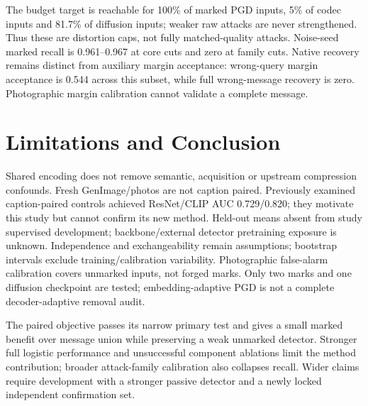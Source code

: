 \documentclass[conference]{IEEEtran}
\begin{document}
The budget target is reachable for 100\% of marked PGD inputs, 5\% of codec
inputs and 81.7\% of diffusion inputs; weaker raw attacks are never strengthened.
Thus these are distortion caps, not fully matched-quality attacks.
Noise-seed marked recall is 0.961--0.967 at core cuts and zero at family cuts.
Native recovery remains distinct from auxiliary margin acceptance: wrong-query
margin acceptance is 0.544 across this subset, while full wrong-message recovery
is zero. Photographic margin calibration cannot validate a complete message.

\section{Limitations and Conclusion}
Shared encoding does not remove semantic, acquisition or upstream compression
confounds. Fresh GenImage/photos are not caption paired. Previously examined
caption-paired controls achieved ResNet/CLIP AUC 0.729/0.820; they motivate
this study but cannot confirm its new method.
Held-out means absent from study supervised development; backbone/external
detector pretraining exposure is unknown. Independence and exchangeability
remain assumptions; bootstrap intervals exclude training/calibration variability.
Photographic false-alarm calibration covers unmarked inputs, not forged marks.
Only two marks and one diffusion checkpoint are tested; embedding-adaptive
PGD is not a complete decoder-adaptive removal audit.

The paired objective passes its narrow primary test and gives a small marked
benefit over message union while preserving a weak unmarked detector.
Stronger full logistic performance and unsuccessful component ablations limit
the method contribution; broader attack-family calibration also collapses recall.
Wider claims require development with a stronger
passive detector and a newly locked independent confirmation set.
\end{document}
